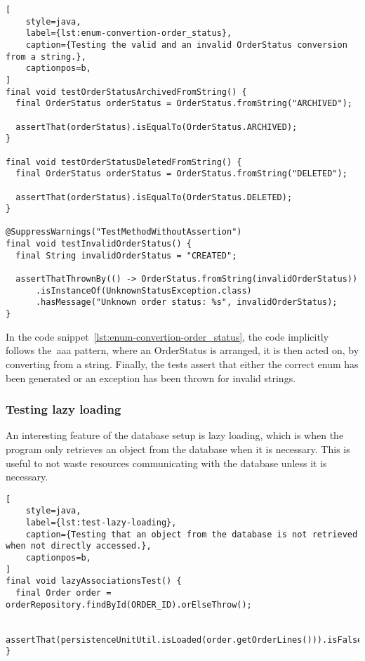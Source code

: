 \begin{lstlisting}[
    style=java,
    label={lst:enum-convertion-order_status},
    caption={Testing the valid and an invalid OrderStatus conversion from a string.},
    captionpos=b,
]
final void testOrderStatusArchivedFromString() {
  final OrderStatus orderStatus = OrderStatus.fromString("ARCHIVED");

  assertThat(orderStatus).isEqualTo(OrderStatus.ARCHIVED);
}

final void testOrderStatusDeletedFromString() {
  final OrderStatus orderStatus = OrderStatus.fromString("DELETED");

  assertThat(orderStatus).isEqualTo(OrderStatus.DELETED);
}

@SuppressWarnings("TestMethodWithoutAssertion")
final void testInvalidOrderStatus() {
  final String invalidOrderStatus = "CREATED";

  assertThatThrownBy(() -> OrderStatus.fromString(invalidOrderStatus))
      .isInstanceOf(UnknownStatusException.class)
      .hasMessage("Unknown order status: %s", invalidOrderStatus);
}
\end{lstlisting}

In the code snippet~\ref{lst:enum-convertion-order_status}, the code implicitly follows the~\acrshort{aaa} pattern,
where an OrderStatus is arranged, it is then acted on, by converting from a string.
Finally, the tests assert that either the correct enum has been generated or an exception has been thrown for invalid
strings.

\subsubsection{Testing lazy loading}\label{subsubsec:lazy-loading-unit-test}

An interesting feature of the database setup is lazy loading, which is when the program only retrieves an object from
the database when it is necessary.
This is useful to not waste resources communicating with the database unless it is necessary.

\begin{lstlisting}[
    style=java,
    label={lst:test-lazy-loading},
    caption={Testing that an object from the database is not retrieved when not directly accessed.},
    captionpos=b,
]
final void lazyAssociationsTest() {
  final Order order = orderRepository.findById(ORDER_ID).orElseThrow();

  assertThat(persistenceUnitUtil.isLoaded(order.getOrderLines())).isFalse();
}
\end{lstlisting}

